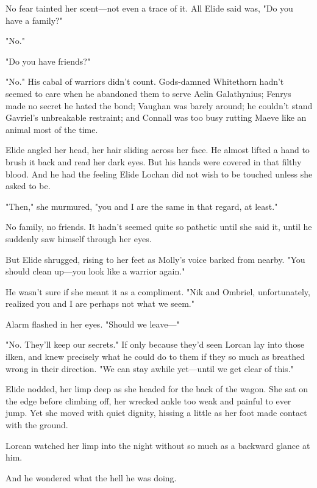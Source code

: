 No fear tainted her scent---not even a trace of it. All Elide said was, "Do you have a family?"

"No."

"Do you have friends?"

"No." His cabal of warriors didn't count. Gods-damned Whitethorn hadn't seemed to care when he abandoned them to serve Aelin Galathynius;
Fenrys made no secret he hated the bond; Vaughan was barely around; he couldn't stand Gavriel's unbreakable restraint; and Connall was too busy rutting Maeve like an animal most of the time.

Elide angled her head, her hair sliding across her face. He almost lifted a hand to brush it back and read her dark eyes. But his hands were covered in that filthy blood. And he had the feeling Elide Lochan did not wish to be touched unless she asked to be.

"Then," she murmured, "you and I are the same in that regard, at least."

No family, no friends. It hadn't seemed quite so pathetic until she said it, until he suddenly saw himself through her eyes.

But Elide shrugged, rising to her feet as Molly's voice barked from nearby. "You should clean up---you look like a warrior again."

He wasn't sure if she meant it as a compliment. "Nik and Ombriel, unfortunately, realized you and I are perhaps not what we seem."

Alarm flashed in her eyes. "Should we leave---"

"No. They'll keep our secrets." If only because they'd seen Lorcan lay into those ilken, and knew precisely what he could do to them if they so much as breathed wrong in their direction. "We can stay awhile yet---until we get clear of this."

Elide nodded, her limp deep as she headed for the back of the wagon. She sat on the edge before climbing off, her wrecked ankle too weak and painful to ever jump. Yet she moved with quiet dignity, hissing a little as her foot made contact with the ground.

Lorcan watched her limp into the night without so much as a backward glance at him.

And he wondered what the hell he was doing.

